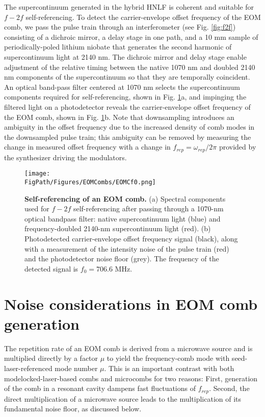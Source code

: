 The supercontinuum generated in the hybrid HNLF is coherent and suitable for $f-2f$ self-referencing. To detect the carrier-envelope offset frequency of the EOM comb, we pass the pulse train through an interferometer (see Fig. \ref{fig:f2f}) consisting of a dichroic mirror, a delay stage in one path, and a 10 mm sample of periodically-poled lithium niobate that generates the second harmonic of supercontinuum light at 2140 nm.  The dichroic mirror and delay stage enable adjustment of the relative timing between the native 1070 nm and doubled 2140 nm components of the supercontinuum so that they are temporally coincident. An optical band-pass filter centered at 1070 nm selects the supercontinuum components required for self-referencing, shown in Fig. \ref{fig:EOMC_f0}a, and impinging the filtered light on a photodetector reveals the carrier-envelope offset frequency of the EOM comb, shown in Fig. \ref{fig:EOMC_f0}b. Note that downsampling introduces an ambiguity in the offset frequency due to the increased density of comb modes in the downsampled pulse train; this ambiguity can be removed by measuring the change in measured offset frequency with a change in $f_{rep}=\omega_{rep}/2\pi$ provided by the synthesizer driving the modulators. 




\begin{figure}[htpb]
	\begin{center}
		\texttt{[image: \\FigPath/Figures/EOMCombs/EOMCf0.png]}
	\end{center}
	\caption[Self-referencing of an EOM comb]{\textbf{Self-referencing of an EOM comb.} (a) Spectral components used for $f-2f$ self-referencing after passing through a 1070-nm optical bandpass filter: native supercontinuum light (blue) and frequency-doubled 2140-nm supercontinuum light (red). (b) Photodetected carrier-envelope offset frequency signal (black), along with a measurement of the intensity noise of the pulse train (red) and the photodetector noise floor (grey). The frequency of the detected signal is $f_0=706.6$ MHz.}
	\label{fig:EOMC_f0}
\end{figure} 



\section{Noise considerations in EOM comb generation}\label{sec:EOMCnoise}



The repetition rate of an EOM comb is derived from a microwave source and is multiplied directly by a factor $\mu$ to yield the frequency-comb mode with seed-laser-referenced mode number $\mu$. This is an important contrast with both modelocked-laser-based combs and microcombs for two reasons: First, generation of the comb in a resonant cavity dampens fast fluctuations of $f_{rep}$. Second, the direct multiplication of a microwave source leads to the multiplication of its fundamental noise floor, as discussed below.


